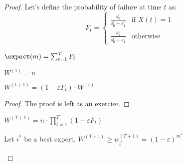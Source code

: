 \begin{proof}
    Let's define the probability of failure at time $t$ as:
    \[
        F_t = \begin{cases}
            \frac{s^t_0}{s^t_0 + s^t_1} &\text{if } X(t)=1\\
            \frac{s^t_1}{s^t_0 + s^t_1} &\text{otherwise}
        \end{cases}
    \]
    
    \begin{claim}\label{cl:exp-rwm-1}
        $\expect(m) = \sum_{t = 1}^{T} F_t$
    \end{claim}

    \begin{claim}\label{cl:exp-rwm-2}
        $W^{(1)} = n$
    \end{claim}

    \begin{claim}\label{cl:exp-rwm-3}
        $W^{(t + 1)} = \left(1 - \varepsilon F_t \right) \cdot W^{(t)}$
    \end{claim}
    \begin{proof}
        The proof is left as an exercise.
    \end{proof}

    \begin{claim}\label{cl:exp-rwm-4}
        $W^{(T + 1)} = n \cdot \prod_{t = 1}^T \left( 1 - \varepsilon F_t \right)$
    \end{claim}

    \begin{claim}\label{cl:exp-rwm-5}
        Let $i^*$ be a best expert, $W^{(T + 1)} \geq w_{i^*}^{(T + 1)} = \left( 1 - \varepsilon \right)^{m^*}$
    \end{claim}


\end{proof}
